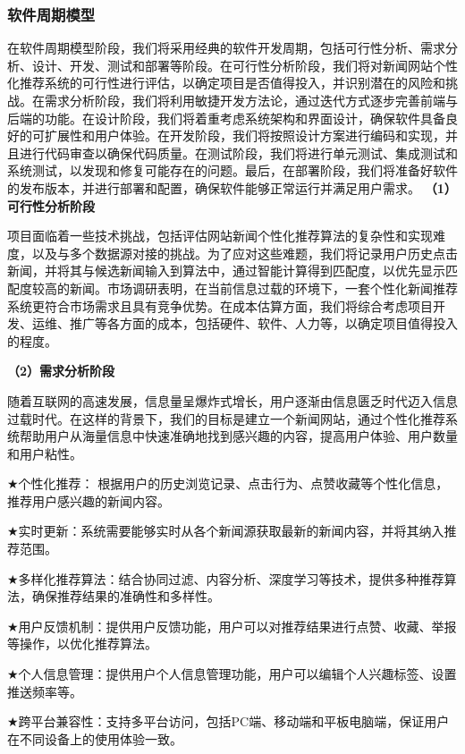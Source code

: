 \documentclass[withoutpreface,bwprint]{cumcmthesis} %
\begin{document}
	\subsubsection{ 软件周期模型}
	在软件周期模型阶段，我们将采用经典的软件开发周期，包括可行性分析、需求分析、设计、开发、测试和部署等阶段。在可行性分析阶段，我们将对新闻网站个性化推荐系统的可行性进行评估，以确定项目是否值得投入，并识别潜在的风险和挑战。在需求分析阶段，我们将利用敏捷开发方法论，通过迭代方式逐步完善前端与后端的功能。在设计阶段，我们将着重考虑系统架构和界面设计，确保软件具备良好的可扩展性和用户体验。在开发阶段，我们将按照设计方案进行编码和实现，并且进行代码审查以确保代码质量。在测试阶段，我们将进行单元测试、集成测试和系统测试，以发现和修复可能存在的问题。最后，在部署阶段，我们将准备好软件的发布版本，并进行部署和配置，确保软件能够正常运行并满足用户需求。
	\textbf{（1）可行性分析阶段}\par
	项目面临着一些技术挑战，包括评估网站新闻个性化推荐算法的复杂性和实现难度，以及与多个数据源对接的挑战。为了应对这些难题，我们将记录用户历史点击新闻，并将其与候选新闻输入到算法中，通过智能计算得到匹配度，以优先显示匹配度较高的新闻。市场调研表明，在当前信息过载的环境下，一套个性化新闻推荐系统更符合市场需求且具有竞争优势。在成本估算方面，我们将综合考虑项目开发、运维、推广等各方面的成本，包括硬件、软件、人力等，以确定项目值得投入的程度。
	\par
	\textbf{（2）需求分析阶段}\par
	随着互联网的高速发展，信息量呈爆炸式增长，用户逐渐由信息匮乏时代迈入信息过载时代。在这样的背景下，我们的目标是建立一个新闻网站，通过个性化推荐系统帮助用户从海量信息中快速准确地找到感兴趣的内容，提高用户体验、用户数量和用户粘性。\par
	$\bigstar$个性化推荐： 根据用户的历史浏览记录、点击行为、点赞收藏等个性化信息，推荐用户感兴趣的新闻内容。\par
	$\bigstar$实时更新：系统需要能够实时从各个新闻源获取最新的新闻内容，并将其纳入推荐范围。\par
	$\bigstar$多样化推荐算法：结合协同过滤、内容分析、深度学习等技术，提供多种推荐算法，确保推荐结果的准确性和多样性。\par
	$\bigstar$用户反馈机制：提供用户反馈功能，用户可以对推荐结果进行点赞、收藏、举报等操作，以优化推荐算法。\par
	$\bigstar$个人信息管理：提供用户个人信息管理功能，用户可以编辑个人兴趣标签、设置推送频率等。\par
	$\bigstar$跨平台兼容性：支持多平台访问，包括PC端、移动端和平板电脑端，保证用户在不同设备上的使用体验一致。\par
\end{document}
